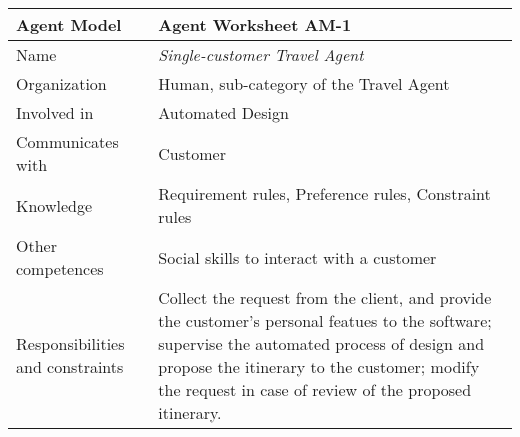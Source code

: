 \begin{tabular}%
       {|p{3cm}%
        |p{9cm}|}
\hline
{\bf Agent Model} & {\bf Agent Worksheet AM-1} \\
\hline
\hline
\sc Name & {\em Single-customer Travel Agent} \\
\hline
\sc Organization & {\rm Human, sub-category of the Travel Agent} \\
\hline
\sc Involved in & {\rm Automated Design} \\
\hline
\sc Communicates with & {\rm Customer} \\
\hline
\sc Knowledge & {\rm Requirement rules, Preference rules, Constraint rules} \\
\hline
\sc Other competences &
              {\rm Social skills to interact with a customer} \\
\hline
\sc Responsibilities and constraints &
              {\rm Collect the request from the client, and provide the customer's personal featues to the software; supervise the automated process of design and propose the itinerary to the customer; modify the request in case of review of the proposed itinerary.} \\
\hline
\end{tabular}
